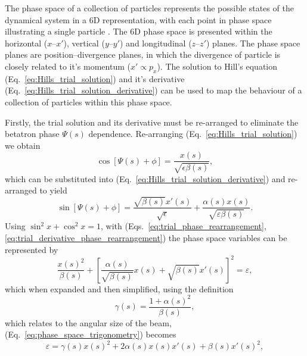 \documentclass[../main.tex]{subfiles}
\begin{document}
The phase space of a collection of particles represents the possible states of the dynamical system in a 6D representation, with each point in phase space illustrating a single particle \cite{jones2016design}. The 6D phase space is presented within the horizontal ($x$--$x'$), vertical ($y$--$y'$) and longitudinal ($z$--$z'$) planes. The phase space planes are position--divergence planes, in which the divergence of particle is closely related to it's momentum ($x' \propto p_{x}$). The solution to Hill's equation (Eq.~\ref{eq:Hills_trial_solution}) and it's derivative (Eq.~\ref{eq:Hills_trial_solution_derivative}) can be used to map the behaviour of a collection of particles within this phase space. 

Firstly, the trial solution and its derivative must be re-arranged to eliminate the betatron phase $\Psi\left(s\right)$ dependence. Re-arranging (Eq.~\ref{eq:Hills_trial_solution}) we obtain
\begin{equation}
\cos\left[\Psi\left(s\right)+\phi\right] = \frac{x\left(s\right)}{\sqrt{\epsilon\beta\left(s\right)}},
\label{eq:trial_phase_rearrangement}    
\end{equation}
which can be substituted into (Eq.~\ref{eq:Hills_trial_solution_derivative}) and re-arranged to yield
\begin{equation}
\sin\left[\Psi\left(s\right)+\phi\right] = \frac{\sqrt{\beta\left(s\right)}x'\left(s\right)}{\sqrt{\epsilon}} + \frac{\alpha\left(s\right)x\left(s\right)}{\sqrt{\varepsilon\beta\left(s\right)}}.
\label{eq:trial_derivative_phase_rearrangement}    
\end{equation}
Using $\sin^{2}x+\cos^{2}x=1$, with (Eqs.~\ref{eq:trial_phase_rearrangement}, \ref{eq:trial_derivative_phase_rearrangement}) the phase space variables can be represented by
\begin{equation}
\frac{x\left(s\right)^{2}}{\beta\left(s\right)}+\left[\frac{\alpha\left(s\right)}{\sqrt{\beta\left(s\right)}}x\left(s\right)+\sqrt{\beta\left(s\right)}x'\left(s\right)\right]^{2} = \varepsilon,  
\label{eq:phase_space_trigonometry}
\end{equation}
which when expanded and then simplified, using the definition
\begin{equation}
\gamma\left(s\right) = \frac{1+\alpha\left(s\right)^{2}}{\beta\left(s\right)},
\label{eq:gamma_twiss}    
\end{equation}
which relates to the angular size of the beam, (Eq.~\ref{eq:phase_space_trigonometry}) becomes
\begin{equation}
\varepsilon = \gamma\left(s\right)x\left(s\right)^{2}+2\alpha\left(s\right)x\left(s\right)x'\left(s\right)+\beta\left(s\right)x'\left(s\right)^{2},
\label{eq:phase_space_ellipse}    
\end{equation}
\end{document}
